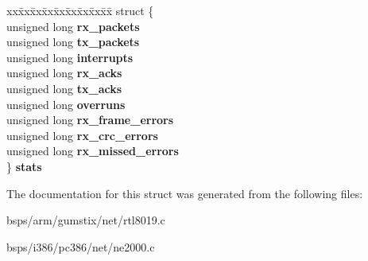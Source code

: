 \begin{DoxyCompactItemize}
\begin{tabbing}
\end{tabbing}\item 
\mbox{\label{structne__softc_ad577617bd5fe1a88d7b4eabc5c07bc83}} 
\begin{tabbing}
xx\=xx\=xx\=xx\=xx\=xx\=xx\=xx\=xx\=\kill
struct \{\\
\>unsigned long {\bfseries rx\_packets}\\
\>unsigned long {\bfseries tx\_packets}\\
\>unsigned long {\bfseries interrupts}\\
\>unsigned long {\bfseries rx\_acks}\\
\>unsigned long {\bfseries tx\_acks}\\
\>unsigned long {\bfseries overruns}\\
\>unsigned long {\bfseries rx\_frame\_errors}\\
\>unsigned long {\bfseries rx\_crc\_errors}\\
\>unsigned long {\bfseries rx\_missed\_errors}\\
\} {\bfseries stats}\\

\end{tabbing}\end{DoxyCompactItemize}


The documentation for this struct was generated from the following files\+:\begin{DoxyCompactItemize}
\item 
bsps/arm/gumstix/net/rtl8019.\+c\item 
bsps/i386/pc386/net/ne2000.\+c\end{DoxyCompactItemize}

